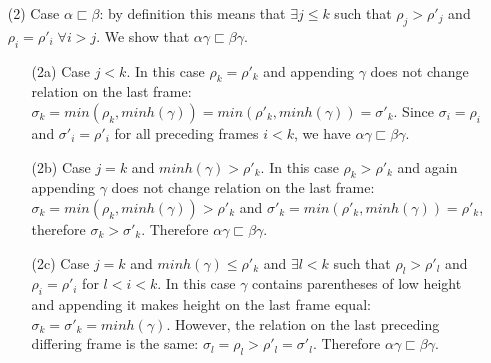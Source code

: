 \documentclass[AMA,STIX1COL]{WileyNJD-v2}
\begin{document}
\begin{proofEnd}
\begin{itemize}[itemsep=0.5em, topsep=0.5em]
    \item[(2)]
        Case $\alpha \sqsubset \beta$:
        by definition this means that $\exists j \leq k$ such that $\rho_j > \rho'_j$ and $\rho_i = \rho'_i \;\forall i > j$.
        We show that $\alpha \gamma \sqsubset \beta \gamma$.
        \begin{itemize}
        \item[(2a)]
            Case $j < k$. In this case $\rho_k = \rho'_k$
            and appending $\gamma$ does not change relation on the last frame:
            $\sigma_k = min (\rho_k, minh (\gamma)) = min (\rho'_k, minh (\gamma)) = \sigma'_k$.
            Since $\sigma_i = \rho_i$ and $\sigma'_i = \rho'_i$ for all preceding frames $i < k$,
            we have $\alpha \gamma \sqsubset \beta \gamma$.

        \item[(2b)]
            Case $j = k$ and $minh (\gamma) > \rho'_k$.
            In this case $\rho_k > \rho'_k$
            and again appending $\gamma$ does not change relation on the last frame:
            $\sigma_k = min (\rho_k, minh (\gamma)) > \rho'_k$ and
            $\sigma'_k = min (\rho'_k, minh (\gamma)) = \rho'_k$, therefore
            $\sigma_k > \sigma'_k$.
            Therefore $\alpha \gamma \sqsubset \beta \gamma$.

        \item[(2c)]
            Case $j = k$ and $minh (\gamma) \leq \rho'_k$
            and $\exists l < k$ such that $\rho_l > \rho'_l$ and $\rho_i = \rho'_i$ for $l < i < k$.
            In this case $\gamma$ contains parentheses of low height
            and appending it makes height on the last frame equal:
            $\sigma_k = \sigma'_k = minh (\gamma)$.
            However, the relation on the last preceding differing frame is the same:
            $\sigma_l = \rho_l > \rho'_l = \sigma'_l$.
            Therefore $\alpha \gamma \sqsubset \beta \gamma$.


\end{itemize}
\end{itemize}
\end{proofEnd}
\end{document}
